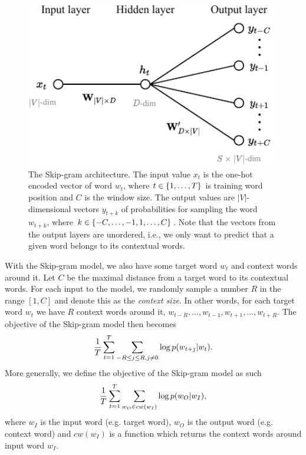 \begin{figure}[H]
    \centering
    \includegraphics[width=11cm]{thesis/figures/skim-gram_cropped.pdf}
    \caption{The Skip-gram architecture. The input value $x_t$ is the one-hot encoded vector of word $w_t$, where $t \in \left\{1, \ldots, T\right\}$ is training word position and $C$ is the window size. The output values are $|V|$-dimensional vectors $y_{t+k}$ of probabilities for sampling the word $w_{t+k}$, where $k \in \left\{-C, \ldots, -1, 1, \ldots, C\right\}$. Note that the vectors from the output layers are unordered, i.e., we only want to predict that a given word belongs to its contextual words.}
    \label{fig:skip-gram-model}
\end{figure}

With the Skip-gram model, we also have some target word $w_t$ and context words around it. Let $C$ be the maximal distance from a target word to its contextual words. For each input to the model, we randomly sample a number $R$ in the range $[1, C]$ and denote this as the \textit{context size}. In other words, for each target word $w_t$ we have $R$ context words around it, $w_{t-R}, \ldots, w_{t-1}, w_{t+1}, \ldots, w_{t+R}$. The objective of the Skip-gram model then becomes
\begin{align}
    \frac{1}{T} \sum\limits_{t=1}^{T} \sum\limits_{-R \leq j \leq R, j \neq 0}^{} \log p(w_{t+j} | w_t).
    \label{eqn:skip-gram-objective-function}
\end{align}
More generally, we define the objective of the Skip-gram model as such
\begin{align}
    \frac{1}{T} \sum\limits_{t=1}^{T} \sum\limits_{w_O \in cw(w_I)}^{} \log p(w_O | w_I),
    \label{eqn:skip-gram-objective-function-general}
\end{align}
where $w_I$ is the input word (e.g. target word), $w_O$ is the output word (e.g. context word) and $cw(w_I)$ is a function which returns the context words around input word $w_I$.

